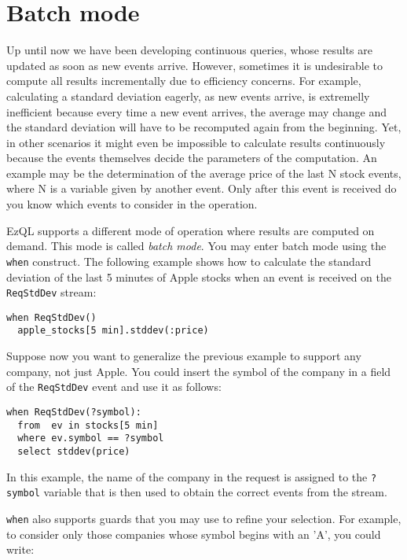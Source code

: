 \documentclass{report}
\begin{document}
\chapter{Batch mode}

Up until now we have been developing continuous queries, whose results
are updated as soon as new events arrive. However, sometimes it is
undesirable to compute all results incrementally due to efficiency
concerns. For example, calculating a standard deviation eagerly, as
new events arrive, is extremelly inefficient because every time a new
event arrives, the average may change and the standard deviation will
have to be recomputed again from the beginning. Yet, in other
scenarios it might even be impossible to calculate results
continuously because the events themselves decide the parameters of
the computation. An example may be the determination of the average
price of the last N stock events, where N is a variable given by
another event. Only after this event is received do you know which
events to consider in the operation.

EzQL supports a different mode of operation where results are computed
on demand. This mode is called \emph{batch mode}. You may enter batch
mode using the \verb=when= construct. The following example shows how
to calculate the standard deviation of the last 5 minutes of Apple
stocks when an event is received on the \verb=ReqStdDev= stream:

\begin{verbatim}
when ReqStdDev()
  apple_stocks[5 min].stddev(:price)
\end{verbatim}

Suppose now you want to generalize the previous example to support any
company, not just Apple. You could insert the symbol of the company in
a field of the \verb=ReqStdDev= event and use it as follows:

\begin{verbatim}
when ReqStdDev(?symbol):
  from  ev in stocks[5 min]
  where ev.symbol == ?symbol
  select stddev(price)
\end{verbatim}

In this example, the name of the company in the request is assigned to
the \verb=?symbol= variable that is then used to obtain the correct
events from the stream.

\verb=when= also supports guards that you may use to refine your
selection. For example, to consider only those companies whose symbol
begins with an 'A', you could write:
\end{document}
